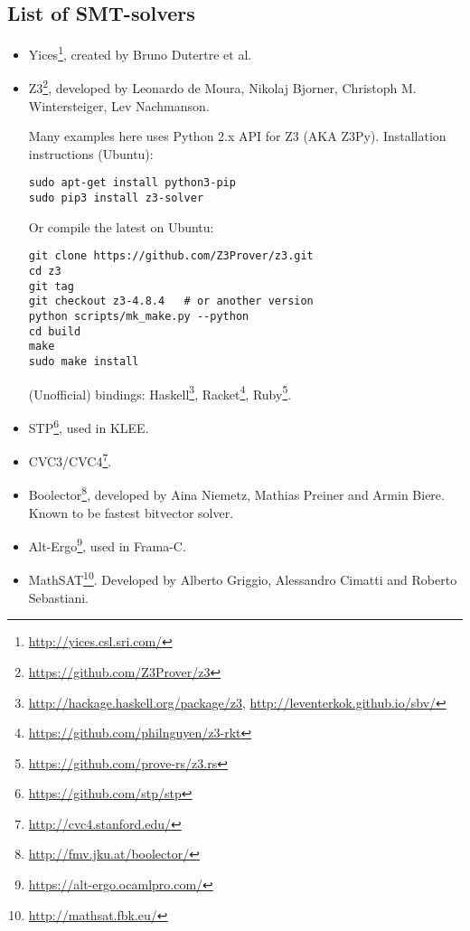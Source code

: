 \subsection{List of SMT-solvers}

\begin{itemize}

\item Yices\footnote{\url{http://yices.csl.sri.com/}}, created by Bruno Dutertre et al.

\item Z3\footnote{\url{https://github.com/Z3Prover/z3}},
developed by Leonardo de Moura, Nikolaj Bjorner, Christoph M. Wintersteiger, Lev Nachmanson.

Many examples here uses Python 2.x API for Z3 (AKA Z3Py).
Installation instructions (Ubuntu):

\begin{lstlisting}
sudo apt-get install python3-pip
sudo pip3 install z3-solver
\end{lstlisting}

Or compile the latest on Ubuntu:

\begin{lstlisting}
git clone https://github.com/Z3Prover/z3.git
cd z3
git tag
git checkout z3-4.8.4	# or another version
python scripts/mk_make.py --python
cd build
make
sudo make install
\end{lstlisting}

(Unofficial) bindings:
Haskell\footnote{\url{http://hackage.haskell.org/package/z3}, \url{http://leventerkok.github.io/sbv/}},
Racket\footnote{\url{https://github.com/philnguyen/z3-rkt}},
Ruby\footnote{\url{https://github.com/prove-rs/z3.rs}}.

\item STP\footnote{\url{https://github.com/stp/stp}}, used in KLEE.

\item CVC3/CVC4\footnote{\url{http://cvc4.stanford.edu/}}.

\item Boolector\footnote{\url{http://fmv.jku.at/boolector/}}, developed by Aina Niemetz, Mathias Preiner and Armin Biere.
Known to be fastest bitvector solver.

\item Alt-Ergo\footnote{\url{https://alt-ergo.ocamlpro.com/}}, used in Frama-C.

\item MathSAT\footnote{\url{http://mathsat.fbk.eu/}}. Developed by Alberto Griggio, Alessandro Cimatti and Roberto Sebastiani.


\end{itemize}
